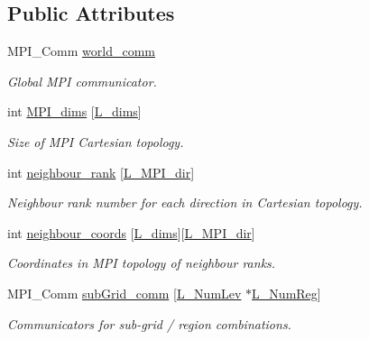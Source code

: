 \subsection*{Public Attributes}
\begin{DoxyCompactItemize}
\item 
M\+P\+I\+\_\+\+Comm \hyperlink{class_mpi_manager_aec1ed834d1a8fa19f87499fb0d5cd332}{world\+\_\+comm}
\begin{DoxyCompactList}\small\item\em Global M\+PI communicator. \end{DoxyCompactList}\item 
int \hyperlink{class_mpi_manager_a8e2e923e656c338148d42517323c9586}{M\+P\+I\+\_\+dims} \mbox{[}\hyperlink{definitions_8h_a11cd469956bf6689c2bc034ee698e0b7}{L\+\_\+dims}\mbox{]}
\begin{DoxyCompactList}\small\item\em Size of M\+PI Cartesian topology. \end{DoxyCompactList}\item 
int \hyperlink{class_mpi_manager_a3f3db562bc7ba8871180c5c9ac388c13}{neighbour\+\_\+rank} \mbox{[}\hyperlink{definitions_8h_a3310be18f0cfda9ca2a17c51518a97e9}{L\+\_\+\+M\+P\+I\+\_\+dir}\mbox{]}
\begin{DoxyCompactList}\small\item\em Neighbour rank number for each direction in Cartesian topology. \end{DoxyCompactList}\item 
int \hyperlink{class_mpi_manager_a6db3764ecc637f90afded1f783acb244}{neighbour\+\_\+coords} \mbox{[}\hyperlink{definitions_8h_a11cd469956bf6689c2bc034ee698e0b7}{L\+\_\+dims}\mbox{]}\mbox{[}\hyperlink{definitions_8h_a3310be18f0cfda9ca2a17c51518a97e9}{L\+\_\+\+M\+P\+I\+\_\+dir}\mbox{]}
\begin{DoxyCompactList}\small\item\em Coordinates in M\+PI topology of neighbour ranks. \end{DoxyCompactList}\item 
M\+P\+I\+\_\+\+Comm \hyperlink{class_mpi_manager_a1c65695e5dd2cca3ccb76e83715226f8}{sub\+Grid\+\_\+comm} \mbox{[}\hyperlink{definitions_8h_aad79fd4a1a3f4399bc6b6b8410886cc6}{L\+\_\+\+Num\+Lev} $\ast$\hyperlink{definitions_8h_ae2c190fd969f872dea6af9cb4e31e1e2}{L\+\_\+\+Num\+Reg}\mbox{]}
\begin{DoxyCompactList}\small\item\em Communicators for sub-\/grid / region combinations. \end{DoxyCompactList}\item 

\end{DoxyCompactItemize}
